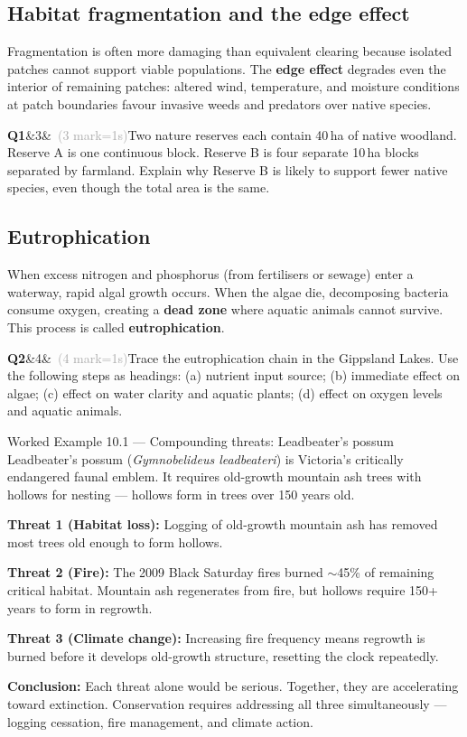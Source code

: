 \documentclass[11pt,a4paper]{article}
\newcommand{\answerbox}[1]{%
  \begin{tcolorbox}[
    enhanced, breakable, arc=2mm,
    colback=Paper, colframe=Line,
    left=2mm, right=2mm, top=1mm, bottom=1mm,
    boxrule=1pt,
    height=#1
  ]
  \end{tcolorbox}%
}
\newcommand{\question}[3]{%
  \needspace{3\baselineskip}%
  \medskip
  \noindent\textbf{Q#1}\ifx&#2&\else\ \textcolor{DarkGrey}{(#2 mark\ifnum#2=1\else s\fi)}\fi\quad #3%
  \medskip
}
\begin{document}
\subsection{Habitat fragmentation and the edge effect}

Fragmentation is often more damaging than equivalent clearing because isolated patches cannot support viable populations. The \textbf{edge effect} degrades even the interior of remaining patches: altered wind, temperature, and moisture conditions at patch boundaries favour invasive weeds and predators over native species.

\begin{yr7box}
\question{1}{3}{Two nature reserves each contain 40\,ha of native woodland. Reserve A is one continuous block. Reserve B is four separate 10\,ha blocks separated by farmland. Explain why Reserve B is likely to support fewer native species, even though the total area is the same.}
\answerbox{5cm}
\end{yr7box}

\subsection{Eutrophication}

When excess nitrogen and phosphorus (from fertilisers or sewage) enter a waterway, rapid algal growth occurs. When the algae die, decomposing bacteria consume oxygen, creating a \textbf{dead zone} where aquatic animals cannot survive. This process is called \textbf{eutrophication}.

\begin{yr7box}
\question{2}{4}{Trace the eutrophication chain in the Gippsland Lakes. Use the following steps as headings: (a) nutrient input source; (b) immediate effect on algae; (c) effect on water clarity and aquatic plants; (d) effect on oxygen levels and aquatic animals.}
\answerbox{6cm}
\end{yr7box}
\newpage
\begin{workedex}{Worked Example 10.1 --- Compounding threats: Leadbeater's possum}
Leadbeater's possum (\textit{Gymnobelideus leadbeateri}) is Victoria's critically endangered faunal emblem. It requires old-growth mountain ash trees with hollows for nesting --- hollows form in trees over 150 years old.

\medskip
\textbf{Threat 1 (Habitat loss):} Logging of old-growth mountain ash has removed most trees old enough to form hollows.

\textbf{Threat 2 (Fire):} The 2009 Black Saturday fires burned $\sim$45\% of remaining critical habitat. Mountain ash regenerates from fire, but hollows require 150+ years to form in regrowth.

\textbf{Threat 3 (Climate change):} Increasing fire frequency means regrowth is burned before it develops old-growth structure, resetting the clock repeatedly.

\textbf{Conclusion:} Each threat alone would be serious. Together, they are accelerating toward extinction. Conservation requires addressing all three simultaneously --- logging cessation, fire management, and climate action.
\end{workedex}
\end{document}
